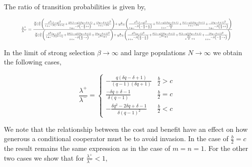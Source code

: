 \documentclass[11pt]{article}
\theoremstyle{plainCl1}
\theoremstyle{plainCl2}
\begin{document}
The ratio of transition probabilities is given by,

\begin{equation}
  \resizebox{.9\textwidth}{!}
  {%
$\frac{\lambda^{+}}{\lambda^{-}} =
\frac{\frac{N - 3}{N-1} \left(\frac{\delta^{2} \left(1 - q\right)^{2}}{1 + e^{- \beta \left(- b + c\right)}} + \frac{2 \delta \left(1 - q\right) \left(\delta q - \delta + 1\right)}{1 + e^{- \beta \left(- \frac{b}{2} + c\right)}} + \frac{\left(\delta q - \delta + 1\right)^{2}}{1 + e^{- \beta c}}\right) 
+ \frac{2}{N-1} \left(\frac{\delta^{2} \left(1 - q\right)^{2}}{1 + e^{- \beta \left(- \frac{b}{2} + \frac{c}{2}\right)}} + \frac{\delta \left(1 - q\right) \left(\delta q - \delta + 1\right)}{1 + e^{- \frac{\beta c}{2}}} + \frac{\delta \left(1 - q\right) \left(\delta q - \delta + 1\right)}{1 + e^{- \beta c}} + \frac{\left(\delta q - \delta + 1\right)^{2}}{1 + e^{- \beta \left(\frac{b}{2} + c\right)}}\right)}
{\frac{N - 3}{N-1} \left(\frac{\delta^{2} \left(q - 1\right)^{2}}{1 + e^{- \beta \left(b - c\right)}} + \frac{2 \delta \left(1 - q\right) \left(\delta q - \delta + 1\right)}{1 + e^{- \beta \left(\frac{b}{2} - c\right)}} + \frac{\left(\delta q - \delta + 1\right)^{2}}{e^{\beta c} + 1}\right) + \frac{2}{N-1} \left(\frac{\delta^{2} \left(q - 1\right)^{2}}{1 + e^{- \beta \left(\frac{b}{2} - \frac{c}{2}\right)}} + \frac{\delta \left(1 - q\right) \left(\delta q - \delta + 1\right)}{e^{\beta c} + 1} + \frac{\delta \left(1 - q\right) \left(\delta q - \delta + 1\right)}{e^{\frac{\beta c}{2}} + 1} + \frac{\left(\delta q - \delta + 1\right)^{2}}{1 + e^{- \beta \left(- \frac{b}{2} - c\right)}}\right)}
$}
\end{equation}

In the limit of strong selection \(\beta \rightarrow \infty\) and large
populations \(N \rightarrow \infty \) we obtain the following cases,

\begin{equation}
\frac{\lambda^{+}}{\lambda^{-}} = 
\begin{cases}
  - \frac{q \left(\delta q - \delta + 1\right)}{\left(q - 1\right) \left(\delta q + 1\right)}  & \frac{b}{2} > c \\[0.5cm]
  \frac{- \delta q + \delta - 1}{\delta \left(q - 1\right)}  & \frac{b}{2} = c \\[0.5cm]
  - \frac{\delta q^{2} - 2 \delta q + \delta - 1}{\delta \left(q - 1\right)^{2}} & \frac{b}{2} < c
\end{cases}
\end{equation}

We note that the relationship between the cost and benefit have an effect on how
generous a conditional cooperator must be to avoid invasion. In the case of
\(\frac{b}{2}=c\) the result remains the same expression as in the case of
\(m=n=1\). For the other two cases we show that for
\(\frac{\lambda^{+}}{\lambda^{-}} < 1\),
\end{document}
